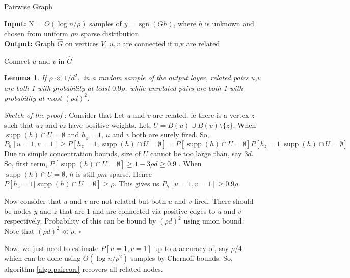 \documentclass[11pt]{article}
\newcommand{\sgn}{\operatorname{sgn}}
\newcommand{\supp}{\operatorname{supp}}
\newtheorem{lemma}{Lemma}
\begin{document}
	\begin{algorithm}
		\caption{Pairwise Graph}
		\textbf{Input:} N = $O(\log n/\rho)$ samples of $y = \sgn(Gh)$, where $h$ is unknown and chosen from uniform $\rho n$ sparse distribution\\
		\textbf{Output:} Graph $\hat{G}$ on vertices $V$, $u,v$ are connected if u,v are related
		
		\begin{algorithmic}[1]
			\STATE Connect $u$ and $v$ in $\hat{G}$
			\ENDIF
			\ENDFOR
		\end{algorithmic}\label{algo:paircorr}
	\end{algorithm}

	\begin{lemma}
		\label{ref:corr}
		If $\rho \ll 1/d^2,$ in a random sample of the output layer, related pairs $u$,$v$ are both 1 with probability at least $0.9\rho$, while unrelated pairs are both 1 with probability at most $(\rho d)^2$.
	\end{lemma}
	\emph{Sketch of the proof} : Consider that Let $u$ and $v$ are related. ie there is a vertex $z$ such that $uz$ and $vz$ have positive weights. Let, $U = B(u) \cup B(v) \setminus \{z\}$. When $\supp(h)\cap U = \emptyset$ and $h_z = 1$, $u$ and $v$ both are surely fired. So, 
	\[
	P_h[u = 1, v = 1] \geq P[h_z = 1, \supp(h)\cap U = \emptyset] = P[ \supp(h)\cap U = \emptyset]P[h_z = 1| \supp(h)\cap U = \emptyset ]
	\]
	Due to simple concentration bounds, size of $U$ cannot be too large than, say $3d$. So, first term, $P[ \supp(h)\cap U = \emptyset] \geq 1-3\rho d \geq 0.9 $ . When $\supp(h)\cap U = \emptyset$, $h$ is still $\rho m$ sparse. Hence $P[h_z = 1| \supp(h)\cap U = \emptyset ] \geq \rho$. This gives us $P_h[u = 1, v = 1] \geq 0.9\rho$.

	Now consider that $u$ and $v$ are not related but both $u$ and $v$ fired. There should be nodes $y$ and $z$ that are $1$ and are connected via positive edges to $u$ and $v$ respectively. Probability of this can be bound by  $(\rho d)^2$ using union bound. Note that  $(\rho d)^2 \ll \rho$. $\square$\vspace{10pt}

	Now, we just need to estimate $P[u = 1, v = 1]$ up to a accuracy of, say $\rho/4$ which can be done using $O(\log n/\rho^2)$ samples by Chernoff bounds. So, algorithm \ref{algo:paircorr} recovers all related nodes.
\end{document}
